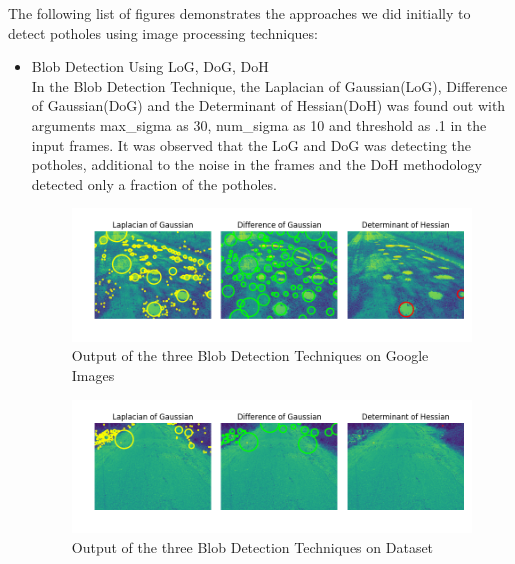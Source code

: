 \documentclass[12pt,a4paper]{article}
\begin{document}
The following list of figures demonstrates the approaches we did initially to detect potholes using image processing techniques:

\begin{itemize}
\item Blob Detection Using LoG, DoG, DoH \\

In the Blob Detection Technique, the Laplacian of Gaussian(LoG), Difference of Gaussian(DoG) and the Determinant of Hessian(DoH) was found out with arguments max\_sigma as 30, num\_sigma as 10 and threshold as .1 in the input frames. It was observed that the LoG and DoG was detecting the potholes, additional to the noise in the frames and the DoH methodology detected only a fraction of the potholes.

    

    \begin{figure}[ht!]
        \begin{center}
        

        \includegraphics[width = 6in]{images/blob_3.png}
        \caption{Output of the three Blob Detection Techniques on Google Images}
                \end{center}
    \end{figure}
    
    
    
    \begin{figure}[ht!]
        \centering
        \includegraphics[width = 6in]{images/blob_1.png}
        \caption{Output of the three Blob Detection Techniques on Dataset}
    \end{figure}
    

\end{itemize}
\end{document}
